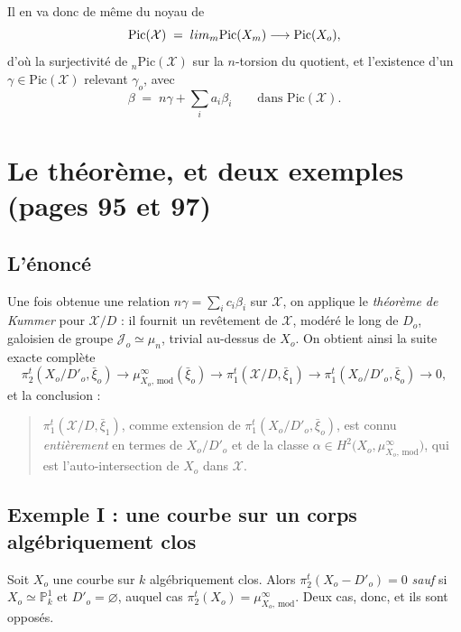 \documentclass[11pt,a4paper]{article}
\begin{document}
Il en va donc de même du noyau de
\[
  \mathrm{Pic}(\mathcal{X}) \;=\; \varprojlim_{m} \mathrm{Pic}(X_{m})
  \longrightarrow \mathrm{Pic}(X_{o}) ,
\]
d'où la surjectivité de ${}_{n}\mathrm{Pic}(\mathcal{X})$ sur la $n$-torsion du
quotient, et l'existence d'un $\gamma \in \mathrm{Pic}(\mathcal{X})$ relevant
$\gamma_{o}$, avec
\[
  \beta \;=\; n\gamma + \sum_{i} a_{i}\beta_{i}
  \qquad \text{dans } \mathrm{Pic}(\mathcal{X}) .
\]

\section*{Le théorème, et deux exemples (pages 95 et 97)}

\subsection*{L'énoncé}

Une fois obtenue une relation $n\gamma = \sum_{i} c_{i}\beta_{i}$ sur
$\mathcal{X}$, on applique le \emph{théorème de Kummer} pour $\mathcal{X}/D$ :
il fournit un revêtement de $\mathcal{X}$, modéré le long de $D_{o}$, galoisien
de groupe $\mathcal{J}_{o} \simeq \mu_{n}$, trivial au-dessus de $X_{o}$. On
obtient ainsi la suite exacte complète
\[
  \pi_{2}^{t}(X_{o}/D'_{o}, \bar{\xi}_{o}) \to
  \mu^{\infty}_{X_{o},\,\mathrm{mod}}(\bar{\xi}_{o}) \to
  \pi_{1}^{t}(\mathcal{X}/D, \bar{\xi}_{1}) \to
  \pi_{1}^{t}(X_{o}/D'_{o}, \bar{\xi}_{o}) \to 0 ,
\]
et la conclusion :

\begin{quote}
$\pi_{1}^{t}(\mathcal{X}/D, \bar{\xi}_{1})$, comme extension de
$\pi_{1}^{t}(X_{o}/D'_{o}, \bar{\xi}_{o})$, est connu \emph{entièrement} en
termes de $X_{o}/D'_{o}$ et de la classe
$\alpha \in H^{2}\bigl(X_{o}, \mu^{\infty}_{X_{o},\,\mathrm{mod}}\bigr)$,
qui est l'auto-intersection de $X_{o}$ dans $\mathcal{X}$.
\end{quote}

\subsection*{Exemple I : une courbe sur un corps algébriquement clos}

Soit $X_{o}$ une courbe sur $k$ algébriquement clos. Alors
$\pi_{2}^{t}(X_{o} - D'_{o}) = 0$ \emph{sauf} si $X_{o} \simeq
\mathbb{P}^{1}_{k}$ et $D'_{o} = \varnothing$, auquel cas
$\pi_{2}^{t}(X_{o}) = \mu^{\infty}_{X_{o},\,\mathrm{mod}}$. Deux cas, donc, et
ils sont opposés.
\end{document}
